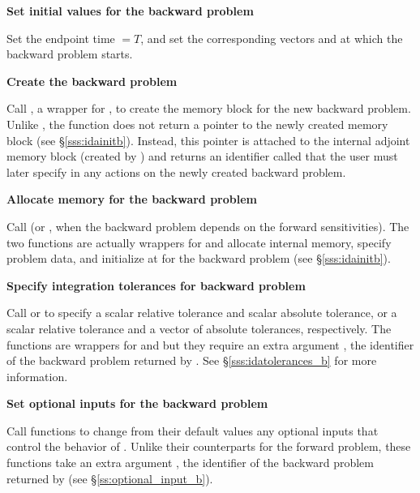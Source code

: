 \begin{Steps}
\item
  {\bf Set initial values for the backward problem}

  Set the endpoint time  $= T$, and set the corresponding vectors 
  and  at which the backward problem starts.

\item
  {\bf Create the backward problem}

  Call , a wrapper for , to create the
  {\idas} memory block for the new backward problem. Unlike ,
  the function  does not return a pointer to the newly created
  memory block (see \S\ref{sss:idainitb}). Instead, this pointer is attached to
  the internal adjoint memory  block (created by ) and returns an
  identifier called  that the user must later specify in any actions on
  the newly created backward problem.

\item
  {\bf Allocate memory for the backward problem}

  Call  (or , when the backward problem depends on the
  forward sensitivities). The two functions are actually wrappers for 
  and allocate internal memory, specify problem data, and initialize {\idas}
  at  for the backward problem (see \S\ref{sss:idainitb}).

\item
  {\bf Specify integration tolerances for backward problem}

  Call  or 
  to specify a scalar relative tolerance and scalar absolute tolerance, or a
  scalar relative tolerance and a vector of absolute tolerances, respectively.
  The functions are wrappers for  and
   but they require an extra argument ,
  the identifier of the backward problem returned by .
  See \S\ref{sss:idatolerances_b} for more information.


\item
  {\bf Set optional inputs for the backward problem}

  Call  functions to change from their default values
  any optional inputs that control the behavior of {\idas}. Unlike
  their counterparts for the forward problem, these functions take an
  extra argument , the identifier of the backward problem returned
  by  (see \S\ref{ss:optional_input_b}).



\end{Steps}
